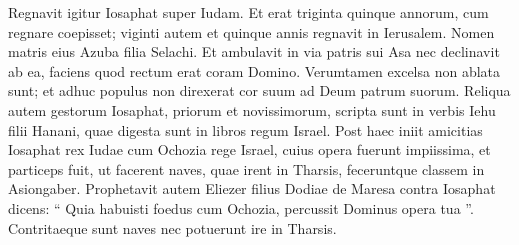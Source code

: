 \begin{biblechapter}
\begin{biblechapter}
\begin{biblechapter}
\begin{biblechapter}
\begin{biblechapter}
\begin{biblechapter}
\begin{biblechapter}
\begin{biblechapter}
\begin{biblechapter}
\begin{biblechapter}
\begin{biblechapter}
\begin{biblechapter}
\begin{biblechapter}
\begin{biblechapter}
\begin{biblechapter}
\begin{biblechapter}
\begin{biblechapter}
\begin{biblechapter}
\begin{biblechapter}
\begin{biblechapter}
 \verse Regnavit igitur Iosaphat super Iudam. Et erat triginta quinque annorum, cum regnare coepisset; viginti autem et quinque annis regnavit in Ierusalem. Nomen matris eius Azuba filia Selachi. 
\verse Et ambulavit in via patris sui Asa nec declinavit ab ea, faciens quod rectum erat coram Domino. 
\verse Verumtamen excelsa non ablata sunt; et adhuc populus non direxerat cor suum ad Deum patrum suorum.
 \verse Reliqua autem gestorum Iosaphat, priorum et novissimorum, scripta sunt in verbis Iehu filii Hanani, quae digesta sunt in libros regum Israel.
 \verse Post haec iniit amicitias Iosaphat rex Iudae cum Ochozia rege Israel, cuius opera fuerunt impiissima, 
\verse et particeps fuit, ut facerent naves, quae irent in Tharsis, feceruntque classem in Asiongaber. 
\verse Prophetavit autem Eliezer filius Dodiae de Maresa contra Iosaphat dicens: “ Quia habuisti foedus cum Ochozia, percussit Dominus opera tua ”. Contritaeque sunt naves nec potuerunt ire in Tharsis.
 

\end{biblechapter}
\end{biblechapter}
\end{biblechapter}
\end{biblechapter}
\end{biblechapter}
\end{biblechapter}
\end{biblechapter}
\end{biblechapter}
\end{biblechapter}
\end{biblechapter}
\end{biblechapter}
\end{biblechapter}
\end{biblechapter}
\end{biblechapter}
\end{biblechapter}
\end{biblechapter}
\end{biblechapter}
\end{biblechapter}
\end{biblechapter}
\end{biblechapter}
